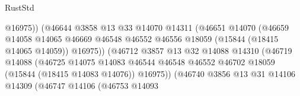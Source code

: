 \begin{lexlean}{RustStd}
\begin{coremodule}
                                              @16975))
                                          (@46644
                                            @3858
                                            @13
                                            @33
                                            @14070
                                            @14311
                                            (@46651
                                              @14070
                                              (@46659
                                                @14058
                                                @14065
                                                @46669
                                                @46548
                                                @46552
                                                @46556
                                                @18059
                                                (@15844 (@18415 @14065 @14059))
                                                @16975))
                                            (@46712
                                              @3857
                                              @13
                                              @32
                                              @14088
                                              @14310
                                              (@46719
                                                @14088
                                                (@46725
                                                  @14075
                                                  @14083
                                                  @46544
                                                  @46548
                                                  @46552
                                                  @46702
                                                  @18059
                                                  (@15844 (@18415 @14083 @14076))
                                                  @16975))
                                              (@46740
                                                @3856
                                                @13
                                                @31
                                                @14106
                                                @14309
                                                (@46747
                                                  @14106
                                                  (@46753
                                                    @14093

\end{coremodule}
\end{lexlean}
